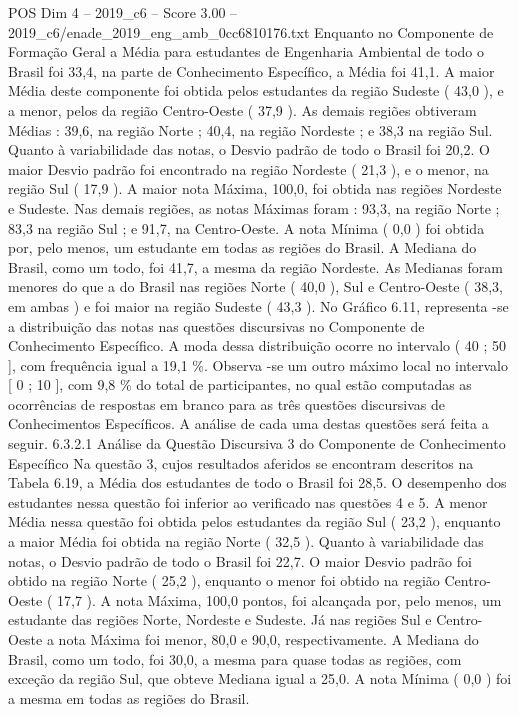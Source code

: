 \begin{textsample}{POS Dim 4 – 2019\_c6 – Score 3.00 – 2019\_c6/enade\_2019\_eng\_amb\_0cc6810176.txt}
Enquanto no Componente de Formação Geral a Média para estudantes de Engenharia Ambiental de todo o Brasil foi 33,4, na parte de Conhecimento Específico, a Média foi 41,1.
A maior Média deste componente foi obtida pelos estudantes da região Sudeste ( 43,0 ), e a menor, pelos da região Centro-Oeste ( 37,9 ).
As demais regiões obtiveram Médias : 39,6, na região Norte ; 40,4, na região Nordeste ; e 38,3 na região Sul.
Quanto à variabilidade das notas, o Desvio padrão de todo o Brasil foi 20,2.
O maior Desvio padrão foi encontrado na região Nordeste ( 21,3 ), e o menor, na região Sul ( 17,9 ).
A maior nota Máxima, 100,0, foi obtida nas regiões Nordeste e Sudeste.
Nas demais regiões, as notas Máximas foram : 93,3, na região Norte ; 83,3 na região Sul ; e 91,7, na Centro-Oeste.
A nota Mínima ( 0,0 ) foi obtida por, pelo menos, um estudante em todas as regiões do Brasil.
A Mediana do Brasil, como um todo, foi 41,7, a mesma da região Nordeste.
As Medianas foram menores do que a do Brasil nas regiões Norte ( 40,0 ), Sul e Centro-Oeste ( 38,3, em ambas ) e foi maior na região Sudeste ( 43,3 ).
No Gráfico 6.11, representa -se a distribuição das notas nas questões discursivas no Componente de Conhecimento Específico.
A moda dessa distribuição ocorre no intervalo ( 40 ; 50 ], com frequência igual a 19,1 \%.
Observa -se um outro máximo local no intervalo [ 0 ; 10 ], com 9,8 \% do total de participantes, no qual estão computadas as ocorrências de respostas em branco para as três questões discursivas de Conhecimentos Específicos.
A análise de cada uma destas questões será feita a seguir. 6.3.2.1 Análise da Questão Discursiva 3 do Componente de Conhecimento Específico Na questão 3, cujos resultados aferidos se encontram descritos na Tabela 6.19, a Média dos estudantes de todo o Brasil foi 28,5.
O desempenho dos estudantes nessa questão foi inferior ao verificado nas questões 4 e 5.
A menor Média nessa questão foi obtida pelos estudantes da região Sul ( 23,2 ), enquanto a maior Média foi obtida na região Norte ( 32,5 ).
Quanto à variabilidade das notas, o Desvio padrão de todo o Brasil foi 22,7.
O maior Desvio padrão foi obtido na região Norte ( 25,2 ), enquanto o menor foi obtido na região Centro-Oeste ( 17,7 ).
A nota Máxima, 100,0 pontos, foi alcançada por, pelo menos, um estudante das regiões Norte, Nordeste e Sudeste.
Já nas regiões Sul e Centro-Oeste a nota Máxima foi menor, 80,0 e 90,0, respectivamente.
A Mediana do Brasil, como um todo, foi 30,0, a mesma para quase todas as regiões, com exceção da região Sul, que obteve Mediana igual a 25,0.
A nota Mínima ( 0,0 ) foi a mesma em todas as regiões do Brasil.

\end{textsample}
